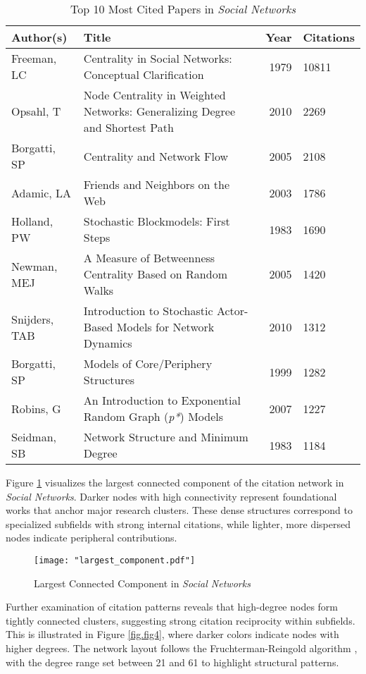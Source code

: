 \documentclass[twocolumn]{article}
\begin{document}
	\begin{table*}[htbp]
		\centering
		\scriptsize
		\caption{Top 10 Most Cited Papers in \textit{Social Networks}}
		\label{table.tab4}
		\begin{tabularx}{\textwidth}{llrl}
			\toprule
			\textbf{Author(s)} & \textbf{Title} & \textbf{Year} & \textbf{Citations} \\
			\midrule
			Freeman, LC & Centrality in Social Networks: Conceptual Clarification & 1979 & 10811 \\
			Opsahl, T & Node Centrality in Weighted Networks: Generalizing Degree and Shortest Path & 2010 & 2269 \\
			Borgatti, SP & Centrality and Network Flow & 2005 & 2108 \\
			Adamic, LA & Friends and Neighbors on the Web & 2003 & 1786 \\
			Holland, PW & Stochastic Blockmodels: First Steps & 1983 & 1690 \\
			Newman, MEJ & A Measure of Betweenness Centrality Based on Random Walks & 2005 & 1420 \\
			Snijders, TAB & Introduction to Stochastic Actor-Based Models for Network Dynamics & 2010 & 1312 \\
			Borgatti, SP & Models of Core/Periphery Structures & 1999 & 1282 \\
			Robins, G & An Introduction to Exponential Random Graph (\textit{p*}) Models & 2007 & 1227 \\
			Seidman, SB & Network Structure and Minimum Degree & 1983 & 1184 \\
			\bottomrule
		\end{tabularx}
	\end{table*}
	
	Figure \ref{fig.fig3} visualizes the largest connected component of the citation network in \textit{Social Networks}. Darker nodes with high connectivity represent foundational works that anchor major research clusters. These dense structures correspond to specialized subfields with strong internal citations, while lighter, more dispersed nodes indicate peripheral contributions.
	
	\begin{figure}[htbp]
		\centering
		\texttt{[image: "largest\_component.pdf"]}
		\caption{Largest Connected Component in \textit{Social Networks}}
		\label{fig.fig3}
	\end{figure}
	
	Further examination of citation patterns reveals that high-degree nodes form tightly connected clusters, suggesting strong citation reciprocity within subfields. This is illustrated in Figure \ref{fig.fig4}, where darker colors indicate nodes with higher degrees. The network layout follows the Fruchterman-Reingold algorithm \cite{fruchterman1991graph}, with the degree range set between 21 and 61 to highlight structural patterns.
	
\end{document}
